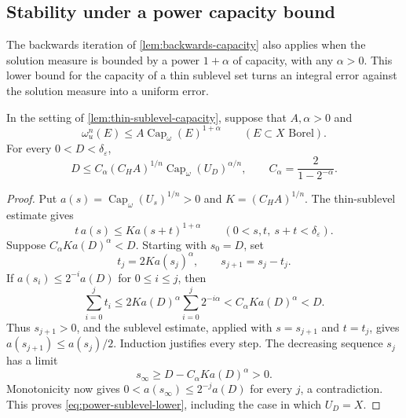 \subsection{Stability under a power capacity bound}
\label{subsec:power-capacity-stability}

The backwards iteration of \cref{lem:backwards-capacity} also applies when the solution measure is bounded by a power $1+\alpha$ of capacity, with any $\alpha>0$. This lower bound for the capacity of a thin sublevel set turns an integral error against the solution measure into a uniform error.

\begin{lemma}\label{lem:power-backwards-capacity}
In the setting of \cref{lem:thin-sublevel-capacity}, suppose that $A,\alpha>0$ and
\[
 \omega_u^n(E)\leq A\operatorname{Cap}_\omega(E)^{1+\alpha}
 \qquad(E\subset X\text{ Borel}).
\]
For every $0<D<\delta_\varepsilon$,
\begin{equation}\label{eq:power-sublevel-lower}
 D\leq C_\alpha(C_HA)^{1/n}
                  \operatorname{Cap}_\omega(U_D)^{\alpha/n},
 \qquad C_\alpha=\frac{2}{1-2^{-\alpha}}.
\end{equation}
\end{lemma}
\begin{proof}
Put $a(s)=\operatorname{Cap}_\omega(U_s)^{1/n}>0$ and $K=(C_HA)^{1/n}$. The thin-sublevel estimate gives
\[
 t\,a(s)\leq K a(s+t)^{1+\alpha}
 \qquad(0<s,t,\ s+t<\delta_\varepsilon).
\]
Suppose $C_\alpha K a(D)^\alpha<D$. Starting with $s_0=D$, set
\[
 t_j=2K a(s_j)^\alpha,\qquad s_{j+1}=s_j-t_j.
\]
If $a(s_i)\leq2^{-i}a(D)$ for $0\leq i\leq j$, then
\[
 \sum_{i=0}^jt_i
 \leq2K a(D)^\alpha\sum_{i=0}^j2^{-i\alpha}
 <C_\alpha K a(D)^\alpha<D.
\]
Thus $s_{j+1}>0$, and the sublevel estimate, applied with $s=s_{j+1}$ and $t=t_j$, gives $a(s_{j+1})\leq a(s_j)/2$. Induction justifies every step. The decreasing sequence $s_j$ has a limit
\[
 s_\infty\geq D-C_\alpha K a(D)^\alpha>0.
\]
Monotonicity now gives $0<a(s_\infty)\leq2^{-j}a(D)$ for every $j$, a contradiction. This proves \eqref{eq:power-sublevel-lower}, including the case in which $U_D=X$.
\end{proof}

